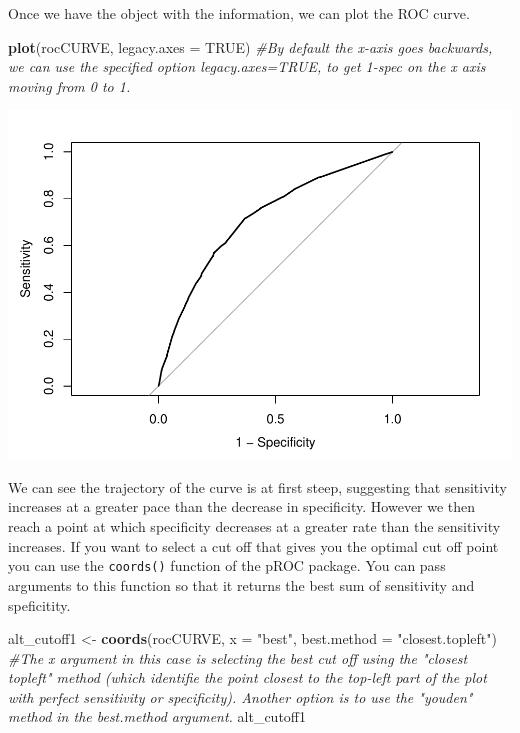 \documentclass[]{book}
\newenvironment{Shaded}{\begin{snugshade}}{\end{snugshade}}
\newcommand{\CommentTok}[1]{\textcolor[rgb]{0.56,0.35,0.01}{\textit{#1}}}
\newcommand{\DataTypeTok}[1]{\textcolor[rgb]{0.13,0.29,0.53}{#1}}
\newcommand{\KeywordTok}[1]{\textcolor[rgb]{0.13,0.29,0.53}{\textbf{#1}}}
\newcommand{\NormalTok}[1]{#1}
\newcommand{\OtherTok}[1]{\textcolor[rgb]{0.56,0.35,0.01}{#1}}
\newcommand{\StringTok}[1]{\textcolor[rgb]{0.31,0.60,0.02}{#1}}
\theoremstyle{definition}
\theoremstyle{definition}
\theoremstyle{definition}
\theoremstyle{remark}
\begin{document}
Once we have the object with the information, we can plot the ROC curve.

\begin{Shaded}
\begin{Highlighting}[]
\KeywordTok{plot}\NormalTok{(rocCURVE, }\DataTypeTok{legacy.axes =} \OtherTok{TRUE}\NormalTok{) }\CommentTok{#By default the x-axis goes backwards, we can use the specified option legacy.axes=TRUE, to get 1-spec on the x axis moving from 0 to 1.}
\end{Highlighting}
\end{Shaded}

\includegraphics{09-logistic_files/figure-latex/unnamed-chunk-25-1.pdf}

We can see the trajectory of the curve is at first steep, suggesting
that sensitivity increases at a greater pace than the decrease in
specificity. However we then reach a point at which specificity
decreases at a greater rate than the sensitivity increases. If you want
to select a cut off that gives you the optimal cut off point you can use
the \texttt{coords()} function of the pROC package. You can pass
arguments to this function so that it returns the best sum of
sensitivity and speficitity.

\begin{Shaded}
\begin{Highlighting}[]
\NormalTok{alt_cutoff1 <-}\StringTok{ }\KeywordTok{coords}\NormalTok{(rocCURVE, }\DataTypeTok{x =} \StringTok{"best"}\NormalTok{, }\DataTypeTok{best.method =} \StringTok{"closest.topleft"}\NormalTok{)}
\CommentTok{#The x argument in this case is selecting the best cut off using the "closest topleft" method (which identifie the point closest to the top-left part of the plot with perfect sensitivity or specificity). Another option is to use the "youden" method in the best.method argument.}
\NormalTok{alt_cutoff1}
\end{Highlighting}
\end{Shaded}
\end{document}
